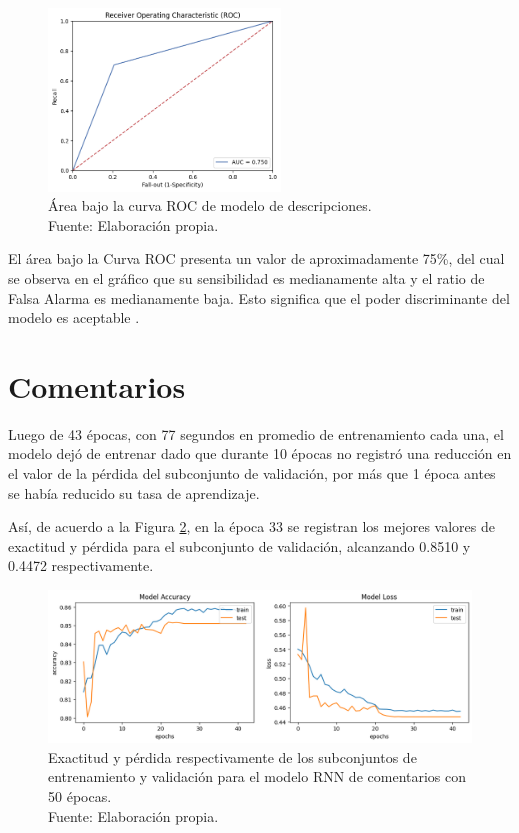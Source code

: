 \begin{figure}[!ht]
	\begin{center}
		\includegraphics[width=0.55\textwidth]{5/figures/description_auc.png}
		\caption[Área bajo la curva ROC de modelo de descripciones]{Área bajo la curva ROC de modelo de descripciones.\\
		Fuente: Elaboración propia.}
		\label{5:fig6}
	\end{center}
\end{figure}

El área bajo la Curva ROC presenta un valor de aproximadamente 75\%, del cual se observa en el gráfico que su sensibilidad es medianamente alta y el ratio de Falsa Alarma es medianamente baja. Esto significa que el poder discriminante del modelo es aceptable \parencite{bk_britos2006datamining}.

\section{Comentarios}
Luego de 43 épocas, con 77 segundos en promedio de entrenamiento cada una, el modelo dejó de entrenar dado que durante 10 épocas no registró una reducción en el valor de la pérdida del subconjunto de validación, por más que 1 época antes se había reducido su tasa de aprendizaje.

Así, de acuerdo a la Figura \ref{5:fig7}, en la época 33 se registran los mejores valores de exactitud y pérdida para el subconjunto de validación, alcanzando 0.8510 y 0.4472 respectivamente.

\begin{figure}[!ht]
	\begin{center}
		\includegraphics[width=1\textwidth]{5/figures/comments_model_acc_loss.png}
		\caption[Exactitud y pérdida respectivamente de los subconjuntos de entrenamiento y validación para el modelo RNN de comentarios con 50 épocas]{Exactitud y pérdida respectivamente de los subconjuntos de entrenamiento y validación para el modelo RNN de comentarios con 50 épocas.\\
		Fuente: Elaboración propia.}
		\label{5:fig7}
	\end{center}
\end{figure}

